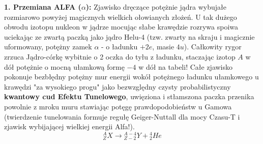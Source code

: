\documentclass[11pt, a4paper]{article}
\begin{document}
\textbf{1. Przemiana ALFA ($\alpha$):}
Zjawisko dręczące potężnie jądra wybujałe rozmiarowo powyżej magicznych wielkich ołowianych złożeń. U tak dużego obwodu izotopu nukleon w jądrze mocując słabe krawędzie rozrywa spoiwa uciekając ze zwartą paczką jako jądro Helu-4 (tzw. zwarty na skraju i magicznie uformowany, potężny zamek $\alpha$ - o ładunku $+2e$, masie $4u$). Całkowity rygor zrzuca Jądro-córkę wybitnie o 2 oczka do tyłu z ładunku, staczając izotop $A$ w dół potężnie o mocną ułamkową formę $-4$ w dół na tabeli! Całe zjawisko pokonuje bezbłędny potężny mur energii wokół potężnego ładunku ułamkowego u krawędzi "za wysokiego progu" jako bezwzględny czysty probabilistyczny \textbf{kwantowy cud Efektu Tunelowego}, uwięziona i stłamszona paczka przenika powolnie z mroku muru stawiając potęgę prawdopodobieństw u Gamowa (twierdzenie tunelowania formuje regułę Geiger-Nuttall dla mocy Czasu-T i zjawisk wybijającej wielkiej energii Alfa!).
\[ {}^{A}_{Z}X \rightarrow {}^{A-4}_{Z-2}Y + {}^{4}_{2}He \]
\end{document}
